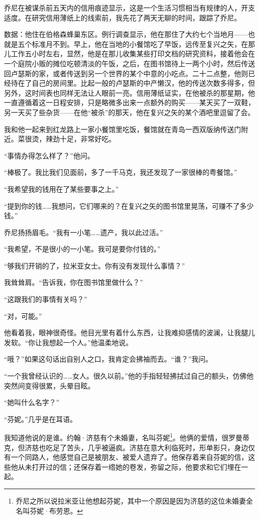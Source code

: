 \documentclass[AutoFakeBold=true]{book}
\begin{document}
乔尼在被谋杀前五天内的信用痕迹显示，这是一个生活习惯相当有规律的人，开支适度。在研究信用薄纸上的线索前，我先花了两天无聊的时间，跟踪了乔尼。

数据：他住在伯格森蜂巢东区。例行调查显示，他在那住了大约七个当地月——也就是五个标准月不到。早上，他在当地的小餐馆吃了早饭，远传至复兴之矢，在那儿工作五小时左右，显然，他是在那儿收集某些打印文档的研究资料，接着他会在一个庭院小贩的摊位吃顿清淡的午饭，之后，在图书馆待上一两个小时，然后传送回卢瑟斯的家，或者传送到另一个世界的某个中意的小吃点。二十二点整，他则已经待在了自己的房间里。比起一般的卢瑟斯的中产懒汉，他的传送次数多得多，但另外，这时间表也同样无法让人眼前一亮。信用薄纸证实，在他被杀的那星期，他一直遵循着这一日程安排，只是略微多出来一点额外的购买——某天买了一双鞋，另一天买了些杂货——在他``被杀''的那天，他在复兴之矢的某个酒吧里逗留了会。

我和他一起来到红龙路上一家小餐馆里吃饭，餐馆就在青岛一西双版纳传送门附近。菜很烫，辣劲十足，非常好吃。

``事情办得怎么样了？''他问。

``棒极了。我比我们见面前，多了一千马克，我还发现了一家很棒的粤餐馆。''

``我希望我的钱用在了某些要事之上。''

``提到你的钱……我想问，它们哪来的？在复兴之矢的图书馆里晃荡，可赚不了多少钱。''

乔尼扬扬眉毛。``我有一小笔……遗产，我以此过活。''

``我希望，不是很小的一小笔。我可是要你付钱的。''

``够我们开销的了，拉米亚女士。你有没有发现什么事情？''

我耸耸肩。``告诉我，你在图书馆里做什么？''

``这跟我们的事情有关吗？''

``对，可能。''

他看着我，眼神很奇怪。他目光里有着什么东西，让我难抑感情的波澜，让我腿儿发软。``你让我想起一个人。''他温柔地说。

``哦？''如果这句话出自别人之口，我肯定会拂袖而去。``谁？''我问。

``一个我曾经认识的……女人。很久以前。''他的手指轻轻拂拭过自己的额头，仿佛他突然间变得很累，头晕目眩。

``她叫什么名字？''

``芬妮。''几乎是在耳语。

我知道他说的是谁。约翰·济慈有个未婚妻，名叫芬妮\footnote{乔尼之所以说拉米亚让他想起芬妮，其中一个原因是因为济慈的这位未婚妻全名叫芬妮·布劳恩。}。他俩的爱情，很罗曼蒂克，但济慈也吃足了苦头，几乎被逼疯。济慈在意大利临死时，形单影只，身边仅有一个同路人，他感觉自己是被朋友、被爱人遗弃了。他保存着来自芬妮的信，这些他从未打开过的信；还保存着一绺她的卷发，弥留之际，他要求和它们埋在一起。
\end{document}
